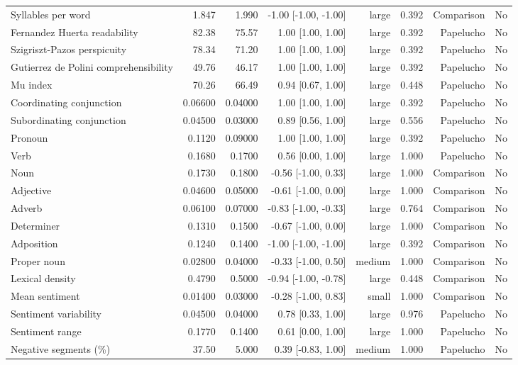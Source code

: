 \begin{table}[htbp]
\begin{tabular}{lrrrrrrr}
Syllables per word & 1.847 & 1.990 & -1.00 [-1.00, -1.00] & large & 0.392 & Comparison & No \\
Fernandez Huerta readability & 82.38 & 75.57 & 1.00 [1.00, 1.00] & large & 0.392 & Papelucho & No \\
Szigriszt-Pazos perspicuity & 78.34 & 71.20 & 1.00 [1.00, 1.00] & large & 0.392 & Papelucho & No \\
Gutierrez de Polini comprehensibility & 49.76 & 46.17 & 1.00 [1.00, 1.00] & large & 0.392 & Papelucho & No \\
Mu index & 70.26 & 66.49 & 0.94 [0.67, 1.00] & large & 0.448 & Papelucho & No \\
Coordinating conjunction & 0.06600 & 0.04000 & 1.00 [1.00, 1.00] & large & 0.392 & Papelucho & No \\
Subordinating conjunction & 0.04500 & 0.03000 & 0.89 [0.56, 1.00] & large & 0.556 & Papelucho & No \\
Pronoun & 0.1120 & 0.09000 & 1.00 [1.00, 1.00] & large & 0.392 & Papelucho & No \\
Verb & 0.1680 & 0.1700 & 0.56 [0.00, 1.00] & large & 1.000 & Papelucho & No \\
Noun & 0.1730 & 0.1800 & -0.56 [-1.00, 0.33] & large & 1.000 & Comparison & No \\
Adjective & 0.04600 & 0.05000 & -0.61 [-1.00, 0.00] & large & 1.000 & Comparison & No \\
Adverb & 0.06100 & 0.07000 & -0.83 [-1.00, -0.33] & large & 0.764 & Comparison & No \\
Determiner & 0.1310 & 0.1500 & -0.67 [-1.00, 0.00] & large & 1.000 & Comparison & No \\
Adposition & 0.1240 & 0.1400 & -1.00 [-1.00, -1.00] & large & 0.392 & Comparison & No \\
Proper noun & 0.02800 & 0.04000 & -0.33 [-1.00, 0.50] & medium & 1.000 & Comparison & No \\
Lexical density & 0.4790 & 0.5000 & -0.94 [-1.00, -0.78] & large & 0.448 & Comparison & No \\
Mean sentiment & 0.01400 & 0.03000 & -0.28 [-1.00, 0.83] & small & 1.000 & Comparison & No \\
Sentiment variability & 0.04500 & 0.04000 & 0.78 [0.33, 1.00] & large & 0.976 & Papelucho & No \\
Sentiment range & 0.1770 & 0.1400 & 0.61 [0.00, 1.00] & large & 1.000 & Papelucho & No \\
Negative segments (\%) & 37.50 & 5.000 & 0.39 [-0.83, 1.00] & medium & 1.000 & Papelucho & No \\

\end{tabular}
\end{table}
